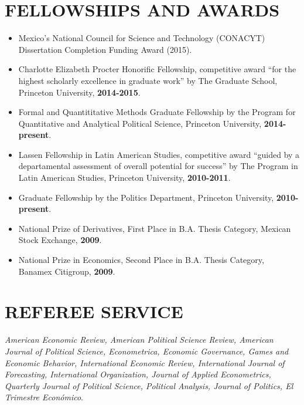 \documentclass[margin, 10pt]{res} %
\begin{document}
\begin{resume}
\section{FELLOWSHIPS AND AWARDS}
\begin{itemize} \itemsep -2pt
\item[-] Mexico's National Council for Science and Technology
  (CONACYT) Dissertation Completion Funding Award (2015).\\
\item[-] Charlotte Elizabeth Procter Honorific Fellowship, competitive
  award ``for the highest scholarly excellence in graduate work'' by
  The Graduate School, Princeton University, \textbf{2014-2015}.\\
\item[-] Formal and Quantititative Methods Graduate Fellowship by the
  Program for Quantitative and Analytical Political Science, Princeton
  University, \textbf{2014-present}.\\
\item[-] Lassen Fellowship in Latin American Studies, competitive award
  ``guided by a departamental assessment of overall potential for
  success'' by The Program in Latin American Studies, Princeton
  University, \textbf{2010-2011}.\\
\item[-] Graduate Fellowship by the Politics Department, Princeton
  University, \textbf{2010-present}.\\
  \item[-] National Prize of Derivatives, First Place in B.A. Thesis
    Category, Mexican Stock Exchange, \textbf{2009}.\\
  \item[-] National Prize in Economics, Second Place in B.A.
    Thesis Category, Banamex Citigroup, \textbf{2009}.\\
\end{itemize}


\section{REFEREE SERVICE}

\emph{American Economic Review, American Political Science Review,
  American Journal of Political Science, Econometrica, Economic
  Governance, Games and Economic Behavior, International Economic Review, International Journal of Forecasting,
  International Organization, Journal of Applied
  Econometrics, Quarterly Journal of Political Science, Political
  Analysis, Journal of Politics, El Trimestre Econ\'{o}mico}.


\end{resume}
\end{document}
